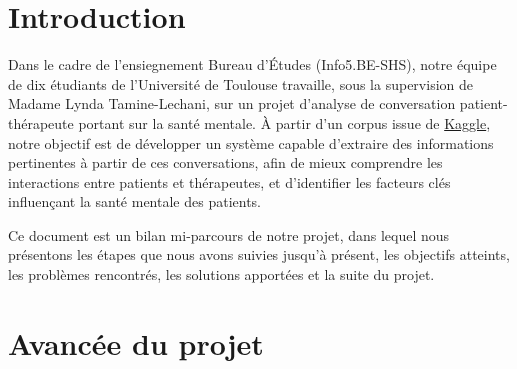 \documentclass[12pt,a4paper]{article}
\begin{document}
\section{Introduction}
Dans le cadre de l'ensiegnement Bureau d'Études (Info5.BE-SHS), notre équipe de dix étudiants de l'Université de Toulouse
travaille, sous la supervision de Madame Lynda Tamine-Lechani, sur un projet d'analyse de conversation patient-thérapeute portant sur la santé mentale.   
À partir d'un corpus issue de \href{https://www.kaggle.com/datasets/thedevastator/nlp-mental-health-conversations}{Kaggle}, 
notre objectif est de développer un système capable d'extraire des informations pertinentes à partir de ces conversations, 
afin de mieux comprendre les interactions entre patients et thérapeutes, et d'identifier les facteurs clés influençant la santé mentale des patients.

Ce document est un bilan mi-parcours de notre projet, dans lequel nous présentons les étapes que nous avons suivies jusqu'à présent,
 les objectifs atteints, les problèmes rencontrés, les solutions apportées et la suite du projet.
\pagebreak


\section{Avancée du projet}
\end{document}
